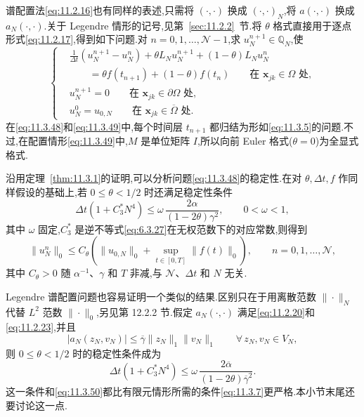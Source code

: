 谱配置法\eqref{eq:11.2.16}也有同样的表述,只需将 \((\cdot,\cdot)\) 换成 \((\cdot,\cdot)_N\),将 \(a(\cdot,\cdot)\) 换成 \(a_N(\cdot,\cdot)\).关于 Legendre 情形的记号,见第~\ref{sec:11.2.2}~节.将 \(\theta\) 格式直接用于逐点形式\eqref{eq:11.2.17},得到如下问题.对 \(n=0,1,\ldots,\mathcal N-1\),求 \(u_N^{n+1}\in\mathbb Q_N\),使
\begin{equation}\label{eq:11.3.49}
  \left\{
  \begin{aligned}
    &\frac1{\Delta t}(u_N^{n+1}-u_N^n)+\theta L_Nu_N^{n+1}+(1-\theta)L_Nu_N^n\\
    &\qquad=\theta f(t_{n+1})+(1-\theta)f(t_n)\qquad\text{在 }\boldsymbol{x}_{jk}\in\Omega\text{ 处},\\
    &u_N^{n+1}=0\qquad\text{在 }\boldsymbol{x}_{jk}\in\partial\Omega\text{ 处},\\
    &u_N^0=u_{0,N}\qquad\text{在 }\boldsymbol{x}_{jk}\in\overline\Omega\text{ 处}.
  \end{aligned}
  \right.
\end{equation}
在\eqref{eq:11.3.48}和\eqref{eq:11.3.49}中,每个时间层 \(t_{n+1}\) 都归结为形如\eqref{eq:11.3.5}的问题.不过,在配置情形\eqref{eq:11.3.49}中,\(M\) 是单位矩阵 \(I\),所以向前 Euler 格式(\(\theta=0\))为全显式格式.

沿用定理~\ref{thm:11.3.1}的证明,可以分析问题\eqref{eq:11.3.48}的稳定性.在对 \(\theta,\Delta t,f\) 作同样假设的基础上,若 \(0\le\theta<1/2\) 时还满足稳定性条件
\begin{equation}\label{eq:11.3.50}
  \Delta t(1+C_3^*N^4)\le
     \omega\,\frac{2\alpha}{(1-2\theta)\gamma^2},\qquad 0<\omega<1,
\end{equation}
其中 \(\omega\) 固定,\(C_3^*\) 是逆不等式\eqref{eq:6.3.27}在无权范数下的对应常数,则得到
\begin{equation}\label{eq:11.3.51}
  \|u_N^n\|_0\le C_\theta\left(\|u_{0,N}\|_0+\sup_{t\in[0,T]}\|f(t)\|_0\right),
      \qquad n=0,1,\ldots,\mathcal N,
\end{equation}
其中 \(C_\theta>0\) 随 \(\alpha^{-1}\)、\(\gamma\) 和 \(T\) 非减,与 \(\mathcal N\)、\(\Delta t\) 和 \(N\) 无关.

Legendre 谱配置问题也容易证明一个类似的结果.区别只在于用离散范数 \(\|\cdot\|_N\) 代替 \(L^2\) 范数 \(\|\cdot\|_0\),另见第 12.2.2 节.假定 \(a_N(\cdot,\cdot)\) 满足\eqref{eq:11.2.20}和\eqref{eq:11.2.23},并且
\[
  |a_N(z_N,v_N)|\le\overline\gamma\|z_N\|_1\|v_N\|_1\qquad\forall\,z_N,v_N\in V_N,
\]
则 \(0\le\theta<1/2\) 时的稳定性条件成为
\[
  \Delta t(1+C_3^*N^4)\le\omega\,\frac{2\overline\alpha}{(1-2\theta)\overline\gamma^2}.
\]
这一条件和\eqref{eq:11.3.50}都比有限元情形所需的条件\eqref{eq:11.3.7}更严格.本小节末尾还要讨论这一点.

